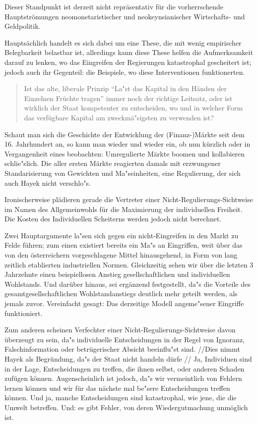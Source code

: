 \documentclass[
        onecolumn,
        a4paper,
        abstracton,
        parskip=half
        ,final
        ]{scrartcl}
\begin{document}
Dieser Standpunkt ist derzeit nicht repr{\"a}sentativ f{\"u}r die vorherrschende Hauptstr{\"o}mungen neomonetaristischer und neokeynsianischer Wirtschafts- und Geldpolitik.

Haupts{\"a}chlich handelt es sich dabei um eine These, die mit wenig empirischer Belegbarkeit belastbar ist, allerdings kann diese These helfen die Aufmerksamkeit darauf zu lenken, wo das Eingreifen der Regierungen katastrophal gescheitert ist; jedoch auch ihr Gegenteil: die Beispiele, wo diese Interventionen funktionerten.

\begin{quote}
Ist das alte, liberale Prinzip "`La{"s}t das Kapital in den H{\"a}nden der Einzelnen Fr{\"u}chte tragen"' immer noch der richtige Leitsatz,
 oder ist wirklich der Staat kompetenter zu entscheiden, wo und in welcher Form das verf{\"u}gbare Kapital am zweckm{\"a}{"s}igsten zu verwenden ist? \citep*[S.23f]{Hayek1969}
\end{quote}

Schaut man sich die Geschichte der Entwicklung der (Finanz-)M{\"a}rkte seit dem 16. Jahrhundert an, so kann man wieder und wieder ein, ob nun k{\"u}rzlich oder in Vergangenheit eines beobachten: Umregulierte M{\"a}rkte boomen und kollabieren schlie{"s}lich. Die aller ersten M{\"a}rkte reagierten damals mit erzwungener Standarisierung von Gewichten und Ma{"s}einheiten, eine Regulierung, der sich auch Hayek nicht verschlo{"s}.

Ironischerweise pl{\"a}dieren gerade die Vertreter einer Nicht-Regulierungs-Sichtweise im Namen des Allgemeinwohls f{\"u}r die Maximierung der individuellen Freiheit. Die Kosten des Individuellen Scheiterns werden jedoch nicht berechnet.

Zwei Hauptargumente la{"s}en sich gegen ein nicht-Eingreifen in den Markt zu Felde f{\"u}hren; zum einen existiert bereits ein Ma{"s} an Eingriffen, weit {\"u}ber das von den {\"o}sterreichern vorgeschlagene Mittel hinausgehend, in Form von lang zeitlich etablierten industriellen Normen. Gleichzeitig sehen wir {\"u}ber die letzten 3 Jahrzehnte einen beispiellosen Anstieg gesellschaftlichen und individuellen Wohlstands. Und dar{\"u}ber hinaus, sei erg{\"a}nzend festgestellt, da{"s} die Vorteile des gesamtgesellschaftlichen Wohlstandanstiegs deutlich mehr geteilt werden, als jemals zuvor. Vereinfacht gesagt: Das derzeitige Modell angeme{"s}ener Eingriffe funktioniert.

Zum anderen scheinen Verfechter einer Nicht-Regulierungs-Sichtweise davon {\"u}berzeugt zu sein, da{"s} individuelle Entscheidungen in der Regel von Ignoranz, Falschinformation oder betr{\"u}gerischer Absicht beeinflu{"s}t sind. //Dies nimmt Hayek als Begr{\"u}ndung, da{"s} der Staat nicht handeln d{\"u}rfe //
Ja, Individuen sind in der Lage, Entscheidungen zu treffen, die ihnen selbst, oder anderen Schaden zuf{\"u}gen k{\"o}nnen. Augenscheinlich ist jedoch, da{"s} wir vermeintlich von Fehlern lernen k{\"o}nnen und wir f{\"u}r das n{\"a}chste mal be{"s}ere Entscheidungen treffen k{\"o}nnen. Und ja, manche Entscheidungen sind katastrophal, wie jene, die die Umwelt betreffen. Und: es gibt Fehler, von deren Wiedergutmachung unm{\"o}glich ist.
\end{document}
